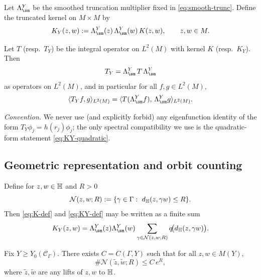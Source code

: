 Let $\Lambda^Y_{\sm}$ be the smoothed truncation multiplier fixed in \eqref{eq:smooth-trunc}.
Define the truncated kernel on $M\times M$ by
\begin{equation}\label{eq:KY-def}
K_Y(z,w):=\Lambda^Y_{\sm}(z)\,\Lambda^Y_{\sm}(w)\,K(z,w),
\qquad z,w\in M.
\end{equation}

\begin{proposition}\label{prop:KY-factor}
Let $T$ (resp.\ $T_Y$) be the integral operator on $L^2(M)$ with kernel $K$ (resp.\ $K_Y$).
Then
\begin{equation}\label{eq:KY-factor}
T_Y=\Lambda^Y_{\sm}\,T\,\Lambda^Y_{\sm}
\end{equation}
as operators on $L^2(M)$, and in particular for all $f,g\in L^2(M)$,
\begin{equation}\label{eq:KY-quadratic}
\langle T_Y f,g\rangle_{L^2(M)}
=
\langle T(\Lambda^Y_{\sm}f),\,\Lambda^Y_{\sm}g\rangle_{L^2(M)}.
\end{equation}
\end{proposition}

\noindent
\emph{Convention.} We never use (and explicitly forbid) any eigenfunction identity of the form
$T_Y\phi_j=h(r_j)\phi_j$; the only spectral compatibility we use is the quadratic-form statement
\eqref{eq:KY-quadratic}.

\subsection{Geometric representation and orbit counting}\label{subsec:block3.2}

Define for $z,w\in\mathbb{H}$ and $R>0$
\[
\mathcal N(z,w;R):=\{\gamma\in\Gamma:\ d_\H(z,\gamma w)\le R\}.
\]
Then \eqref{eq:K-def} and \eqref{eq:KY-def} may be written as a finite sum
\begin{equation}\label{eq:KY-gammasum}
K_Y(z,w)=\Lambda^Y_{\sm}(z)\Lambda^Y_{\sm}(w)\sum_{\gamma\in\mathcal N(z,w;R)} q\!\bigl(d_\H(z,\gamma w)\bigr).
\end{equation}

\begin{lemma}\label{lem:latticepoint-upper}
Fix $Y\ge Y_0(\mathscr C_\Gamma)$. There exists $C=C(\Gamma,Y)$ such that for all $z,w\in M(Y)$,
\begin{equation}\label{eq:latticepoint-upper}
\#\mathcal N(\tilde z,\tilde w;R)\le C\,e^{R},
\end{equation}
where $\tilde z,\tilde w$ are any lifts of $z,w$ to $\mathbb{H}$.
\end{lemma}

